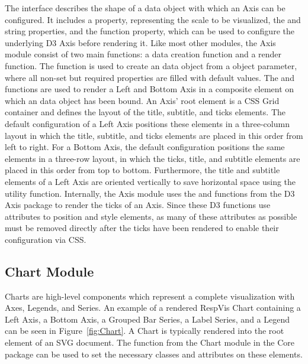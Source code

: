 The  interface describes the shape of a data object with
which an Axis can be configured. It includes a  property,
representing the scale to be visualized, the  and
 string properties, and the 
function property, which can be used to configure the underlying D3
Axis before rendering it. Like most other modules, the Axis module
consist of two main functions: a data creation function and a render
function. The  function is used to create an
 data object from a  object parameter,
where all non-set but required properties are filled with default
values. The  and 
functions are used to render a Left and Bottom Axis in a composite
element on which an  data object has been bound. An Axis'
root element is a CSS Grid container and defines the layout of the
title, subtitle, and ticks elements. The default configuration of a
Left Axis positions these elements in a three-column layout in which
the title, subtitle, and ticks elements are placed in this order from
left to right. For a Bottom Axis, the default configuration positions
the same elements in a three-row layout, in which the ticks, title,
and subtitle elements are placed in this order from top to bottom.
Furthermore, the title and subtitle elements of a Left Axis are
oriented vertically to save horizontal space using the
 utility function. Internally, the Axis
module uses the  and  functions
from the D3 Axis package \parencite{D3Axis} to render the ticks of an
Axis. Since these D3 functions use attributes to position and style
elements, as many of these attributes as possible must be removed
directly after the ticks have been rendered to enable their
configuration via CSS.






\subsection{Chart Module}
\label{sec:Chart}

Charts are high-level components which represent a complete
visualization with Axes, Legends, and Series. An example of a rendered
RespVis Chart containing a Left Axis, a Bottom Axis, a Grouped Bar
Series, a Label Series, and a Legend can be seen in
Figure~\ref{fig:Chart}. A Chart is typically rendered into the root
 element of an SVG document. The 
function from the  Chart module in the Core
package can be used to set the necessary classes and attributes on
these  elements.


